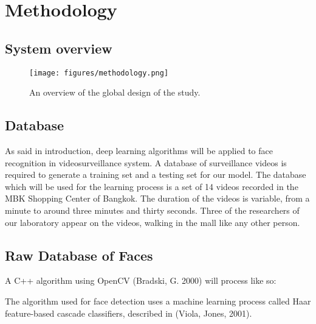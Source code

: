 \setlength{\footskip}{8mm}

\chapter{Methodology}
\label{ch:methodology}

\section{System overview}

\begin{figure}[!ht]
  \centering
  \texttt{[image: figures/methodology.png]}  
  \caption[An overview of the global design of the study.]{An overview of the global design of the study.}
  \label{fig:Methodology}
\end{figure}


\section{Database}
As said in introduction, deep learning algorithms will be applied to face recognition in videosurveillance system. A database of surveillance videos is required to generate a training set and a testing set for our model.
The database which will be used for the learning process is a set of 14 videos recorded in the MBK Shopping Center of Bangkok. The duration of the videos is variable, from a minute to around three minutes and thirty seconds. Three of the researchers of our laboratory appear on the videos, walking in the mall like any other person.

\section{Raw Database of Faces}

A C++ algorithm using OpenCV (Bradski, G. 2000) will process like so:


The algorithm used for face detection uses a machine learning process called Haar feature-based cascade classifiers, described in (Viola, Jones, 2001).

